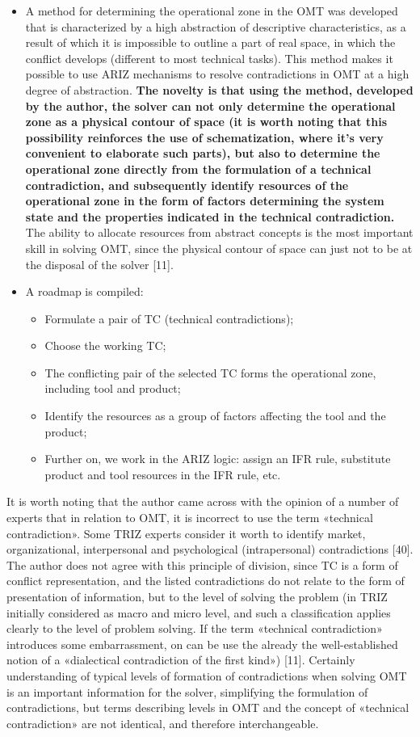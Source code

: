 \documentclass[11pt,a4paper]{book}
\begin{document}
\begin{itemize}
\item A method for determining the operational zone in the OMT was developed
  that is characterized by a high abstraction of descriptive characteristics,
  as a result of which it is impossible to outline a part of real space, in
  which the conflict develops (different to most technical tasks).  This
  method makes it possible to use ARIZ mechanisms to resolve contradictions in
  OMT at a high degree of abstraction. \textbf{The novelty is that using the
    method, developed by the author, the solver can not only determine the
    operational zone as a physical contour of space (it is worth noting that
    this possibility reinforces the use of schematization, where it’s very
    convenient to elaborate such parts), but also to determine the operational
    zone directly from the formulation of a technical contradiction, and
    subsequently identify resources of the operational zone in the form of
    factors determining the system state and the properties indicated in the
    technical contradiction.} The ability to allocate resources from abstract
  concepts is the most important skill in solving OMT, since the physical
  contour of space can just not to be at the disposal of the solver [11].
\item A roadmap is compiled:
  \begin{itemize}
  \item Formulate a pair of TC (technical contradictions);
  \item Choose the working TC;
  \item The conflicting pair of the selected TC forms the operational zone,
    including tool and product;
  \item Identify the resources as a group of factors affecting the tool and
    the product;
  \item Further on, we work in the ARIZ logic: assign an IFR rule, substitute
    product and tool resources in the IFR rule, etc.
  \end{itemize}
\end{itemize}
It is worth noting that the author came across with the opinion of a number of
experts that in relation to OMT, it is incorrect to use the term «technical
contradiction». Some TRIZ experts consider it worth to identify market,
organizational, interpersonal and psychological (intrapersonal) contradictions
[40]. The author does not agree with this principle of division, since TC is a
form of conflict representation, and the listed contradictions do not relate
to the form of presentation of information, but to the level of solving the
problem (in TRIZ initially considered as macro and micro level, and such a
classification applies clearly to the level of problem solving. If the term
«technical contradiction» introduces some embarrassment, on can be use the
already the well-established notion of a «dialectical contradiction of the
first kind») [11]. Certainly understanding of typical levels of formation of
contradictions when solving OMT is an important information for the solver,
simplifying the formulation of contradictions, but terms describing levels in
OMT and the concept of «technical contradiction» are not identical, and
therefore interchangeable.
\end{document}
